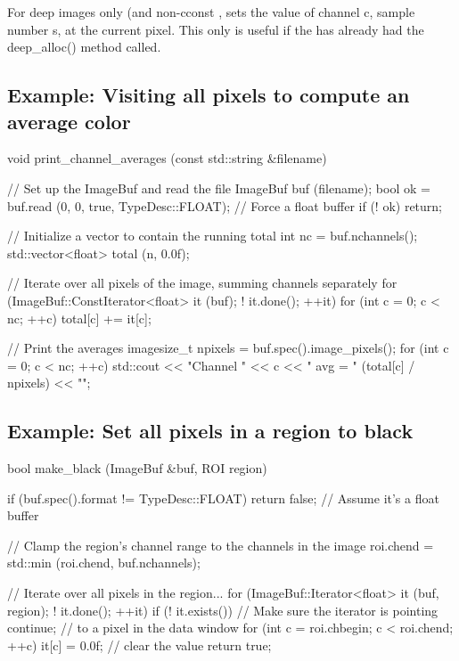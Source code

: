 For deep images only (and non-cconst \ImageBuf, sets the value of channel
{\cf c}, sample number {\cf s}, at the current pixel. This only is useful
if the \ImageBuf has already had the {\cf deep_alloc()} method called.
\apiend

\subsection*{Example: Visiting all pixels to compute an average color}

\begin{code}
void print_channel_averages (const std::string &filename)
{
    // Set up the ImageBuf and read the file
    ImageBuf buf (filename);
    bool ok = buf.read (0, 0, true, TypeDesc::FLOAT);  // Force a float buffer
    if (! ok)
        return;

    // Initialize a vector to contain the running total
    int nc = buf.nchannels();
    std::vector<float> total (n, 0.0f);

    // Iterate over all pixels of the image, summing channels separately
    for (ImageBuf::ConstIterator<float> it (buf);  ! it.done();  ++it)
        for (int c = 0;  c < nc;  ++c)
            total[c] += it[c];

    // Print the averages
    imagesize_t npixels = buf.spec().image_pixels();
    for (int c = 0;  c < nc;  ++c)
        std::cout << "Channel " << c << " avg = " (total[c] / npixels) << "\n";
}
\end{code}


\subsection*{Example: Set all pixels in a region to black}
\label{makeblackexample}

\begin{code}
bool make_black (ImageBuf &buf, ROI region)
{
    if (buf.spec().format != TypeDesc::FLOAT)
        return false;    // Assume it's a float buffer

    // Clamp the region's channel range to the channels in the image
    roi.chend = std::min (roi.chend, buf.nchannels);

    // Iterate over all pixels in the region...
    for (ImageBuf::Iterator<float> it (buf, region);  ! it.done();  ++it) {
        if (! it.exists())   // Make sure the iterator is pointing
            continue;        //   to a pixel in the data window
        for (int c = roi.chbegin;  c < roi.chend;  ++c)
            it[c] = 0.0f;  // clear the value
    }
    return true;
}
\end{code}


